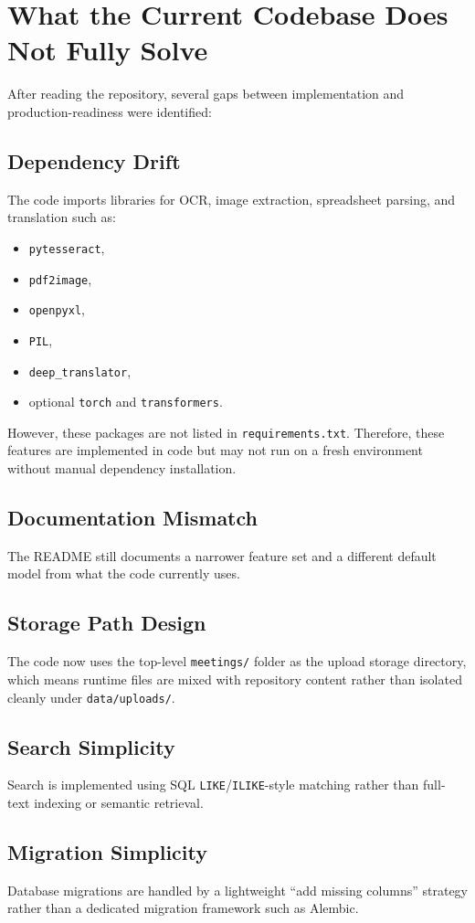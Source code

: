 \documentclass[12pt, a4paper]{article}
\begin{document}
\section{What the Current Codebase Does Not Fully Solve}
After reading the repository, several gaps between implementation and production-readiness were identified:

\subsection{Dependency Drift}
The code imports libraries for OCR, image extraction, spreadsheet parsing, and translation such as:
\begin{itemize}
\item \texttt{pytesseract},
\item \texttt{pdf2image},
\item \texttt{openpyxl},
\item \texttt{PIL},
\item \texttt{deep\_translator},
\item optional \texttt{torch} and \texttt{transformers}.
\end{itemize}
However, these packages are not listed in \texttt{requirements.txt}. Therefore, these features are implemented in code but may not run on a fresh environment without manual dependency installation.

\subsection{Documentation Mismatch}
The README still documents a narrower feature set and a different default model from what the code currently uses.

\subsection{Storage Path Design}
The code now uses the top-level \texttt{meetings/} folder as the upload storage directory, which means runtime files are mixed with repository content rather than isolated cleanly under \texttt{data/uploads/}.

\subsection{Search Simplicity}
Search is implemented using SQL \texttt{LIKE}/\texttt{ILIKE}-style matching rather than full-text indexing or semantic retrieval.

\subsection{Migration Simplicity}
Database migrations are handled by a lightweight ``add missing columns'' strategy rather than a dedicated migration framework such as Alembic.
\end{document}
